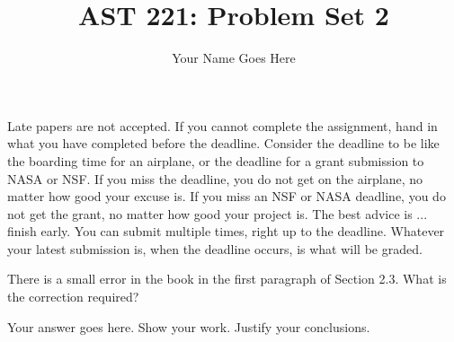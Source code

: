 \documentclass[12pt]{article}
\newenvironment{problem}[2][Problem]{\begin{trivlist}
\item[\hskip \labelsep {\bfseries #1}\hskip \labelsep {\bfseries #2.}]}{\end{trivlist}}
\newenvironment{answer}[2][Answer]{\begin{trivlist}
\item[\hskip \labelsep {\bfseries #1}\hskip \labelsep {\bfseries #2.}]}{\end{trivlist}}
\begin{document}
 
 
\title{AST 221: Problem Set 2}
\author{Your Name Goes Here}
\maketitle

 Late papers are not accepted. If you cannot complete the assignment, hand in what you have completed before the deadline. Consider the deadline to be like the boarding time for an airplane, or the deadline for a grant submission to NASA or NSF. If you miss the deadline, you do not get on the airplane, no matter how good your excuse is. If you miss an NSF or NASA deadline, you do not get the grant, no matter how good your project is. The best advice is ... finish early. You can submit multiple times, right up to the deadline. Whatever your latest submission is, when the deadline occurs, is what will be graded.
 
\begin{problem}{1}  There is a small error in the book in the first paragraph of Section 2.3. What is the correction required?

\end{problem}

\begin{answer}{1}
Your answer goes here. Show your work. Justify your conclusions.
\end{answer}
\end{document}
